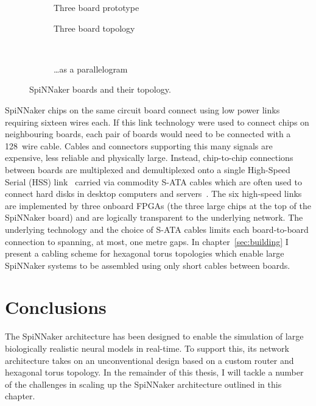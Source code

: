 \begin{figure}
\begin{subfigure}[b]{0.45\linewidth}
				\caption{Three board prototype}
				\label{fig:threeboard}
			\end{subfigure}
			
			\vspace*{1em}
			
			\begin{subfigure}[b]{0.45\linewidth}
				\center
				
				\caption{Three board topology}
				\label{fig:threeboard-separate}
			\end{subfigure}
			~~~
			\begin{subfigure}[b]{0.45\linewidth}
				\center
				
				\caption{\ldots{}as a parallelogram}
				\label{fig:threeboard-wrapped}
			\end{subfigure}
			
			\caption{SpiNNaker boards and their topology.}
			\label{fig:spinnaker-boards}
		\end{figure}
		
		
		SpiNNaker chips on the same circuit board connect using low power links
		requiring sixteen wires each.  If this link technology were used to connect
		chips on neighbouring boards, each pair of boards would need to be
		connected with a 128~wire cable.  Cables and connectors supporting this
		many signals are expensive, less reliable and physically large. Instead,
		chip-to-chip connections between boards are multiplexed and demultiplexed
		onto a single High-Speed Serial (HSS) link~\cite{athavale05} carried via
		commodity S-ATA cables which are often used to connect hard disks in
		desktop computers and servers~\cite{sata3spec}. The six high-speed links
		are implemented by three onboard FPGAs (the three large chips at the top of
		the SpiNNaker board) and are logically transparent to the underlying
		network. The underlying technology and the choice of S-ATA cables limits
		each board-to-board connection to spanning, at most, one metre gaps. In
		chapter~\ref{sec:building} I present a cabling scheme for hexagonal torus
		topologies which enable large SpiNNaker systems to be assembled using only
		short cables between boards.
		
	\section{Conclusions}
		
		The SpiNNaker architecture has been designed to enable the simulation of
		large biologically realistic neural models in real-time. To support this,
		its network architecture takes on an unconventional design based on a
		custom router and hexagonal torus topology. In the remainder of this
		thesis, I will tackle a number of the challenges in scaling up the
		SpiNNaker architecture outlined in this chapter.
